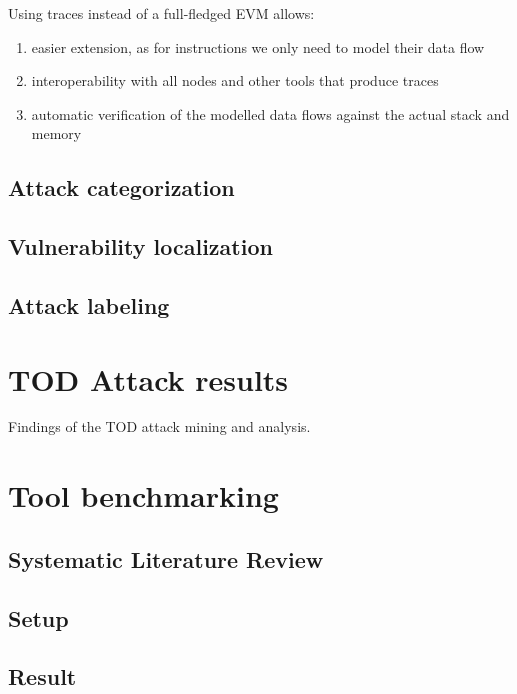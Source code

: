 \documentclass[draft,final]{vutinfth} %
\begin{document}
Using traces instead of a full-fledged EVM allows:

\begin{enumerate}
    \item easier extension, as for instructions we only need to model their data flow
    \item interoperability with all nodes and other tools that produce traces
    \item automatic verification of the modelled data flows against the actual stack and memory
\end{enumerate}

\section{Attack categorization}

\section{Vulnerability localization}

\section{Attack labeling}

\chapter{TOD Attack results}

Findings of the TOD attack mining and analysis.

\chapter{Tool benchmarking}

\section{Systematic Literature Review}

\section{Setup}

\section{Result}



\end{document}
